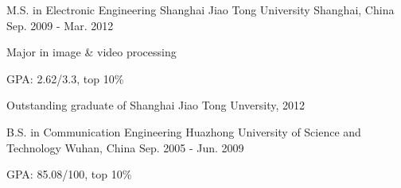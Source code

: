 

\begin{cventries}

  \cventry
    {M.S. in Electronic Engineering} %
    {Shanghai Jiao Tong University} %
    {Shanghai, China} %
    {Sep. 2009 - Mar. 2012} %
    {
      \begin{cvitems} %
        \item {Major in image \& video processing}
        \item {GPA: 2.62/3.3, top 10\%}
        \item {Outstanding graduate of Shanghai Jiao Tong Unversity, 2012}
      \end{cvitems}
    }

  \cventry
    {B.S. in Communication Engineering} %
    {Huazhong University of Science and Technology} %
    {Wuhan, China} %
    {Sep. 2005 - Jun. 2009} %
    {
      \begin{cvitems} %
        \item {GPA: 85.08/100, top 10\%}
      \end{cvitems}
    }

\end{cventries}
